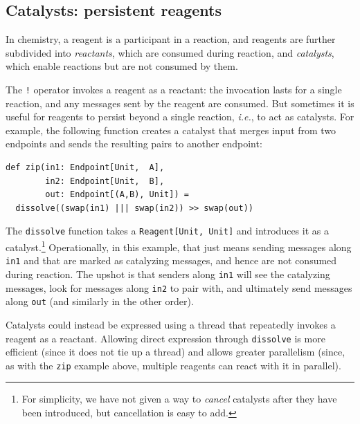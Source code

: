 \documentclass[preprint]{sigplanconf}
\begin{document}

\subsection{Catalysts: persistent reagents}
\label{sec:catalysts}

In chemistry, a reagent is a participant in a reaction, and reagents are
further subdivided into \emph{reactants}, which are consumed during reaction,
and \emph{catalysts}, which enable reactions but are not consumed by them.

The \lstinline{!} operator invokes a reagent as a reactant: the invocation
lasts for a single reaction, and any messages sent by the reagent are
consumed.  But sometimes it is useful for reagents to persist beyond a single
reaction, \emph{i.e.}, to act as catalysts.  For example, the following
function creates a catalyst that merges input from two endpoints and sends the
resulting pairs to another endpoint:
\begin{lstlisting}
def zip(in1: Endpoint[Unit,  A], 
        in2: Endpoint[Unit,  B], 
        out: Endpoint[(A,B), Unit]) = 
  dissolve((swap(in1) ||| swap(in2)) >> swap(out))
\end{lstlisting}
The \lstinline{dissolve} function takes a \lstinline{Reagent[Unit, Unit]} and
introduces it as a catalyst.\footnote{For simplicity, we have not given a way
  to \emph{cancel} catalysts after they have been introduced, but cancellation
  is easy to add.}  Operationally, in this example, that just means sending
messages along \lstinline{in1} and  that are marked as
catalyzing messages, and hence are not consumed during reaction.  The upshot
is that senders along \lstinline{in1} will see the catalyzing messages, look
for messages along \lstinline{in2} to pair with, and ultimately send messages
along \lstinline{out} (and similarly in the other order).

Catalysts could instead be expressed using a thread that repeatedly invokes a
reagent as a reactant.  Allowing direct expression through
\lstinline{dissolve} is more efficient (since it does not tie up a thread) and
allows greater parallelism (since, as with the \lstinline{zip} example above,
multiple reagents can react with it in parallel).
\end{document}
